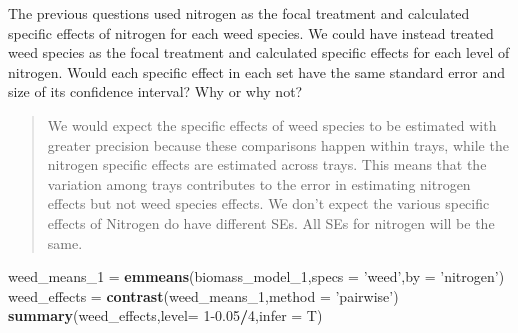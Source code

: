 \documentclass[
]{article}
\newenvironment{Shaded}{\begin{snugshade}}{\end{snugshade}}
\newcommand{\DataTypeTok}[1]{\textcolor[rgb]{0.13,0.29,0.53}{#1}}
\newcommand{\DecValTok}[1]{\textcolor[rgb]{0.00,0.00,0.81}{#1}}
\newcommand{\FloatTok}[1]{\textcolor[rgb]{0.00,0.00,0.81}{#1}}
\newcommand{\KeywordTok}[1]{\textcolor[rgb]{0.13,0.29,0.53}{\textbf{#1}}}
\newcommand{\NormalTok}[1]{#1}
\newcommand{\OperatorTok}[1]{\textcolor[rgb]{0.81,0.36,0.00}{\textbf{#1}}}
\newcommand{\StringTok}[1]{\textcolor[rgb]{0.31,0.60,0.02}{#1}}
\begin{document}
The previous questions used nitrogen as the focal treatment and
calculated specific effects of nitrogen for each weed species. We could
have instead treated weed species as the focal treatment and calculated
specific effects for each level of nitrogen. Would each specific effect
in each set have the same standard error and size of its confidence
interval? Why or why not?

\begin{quote}
We would expect the specific effects of weed species to be estimated
with greater precision because these comparisons happen within trays,
while the nitrogen specific effects are estimated across trays. This
means that the variation among trays contributes to the error in
estimating nitrogen effects but not weed species effects. We don't
expect the various specific effects of Nitrogen do have different SEs.
All SEs for nitrogen will be the same.
\end{quote}

\begin{Shaded}
\begin{Highlighting}[]
\NormalTok{weed_means_}\DecValTok{1}\NormalTok{ =}\StringTok{ }\KeywordTok{emmeans}\NormalTok{(biomass_model_}\DecValTok{1}\NormalTok{,}\DataTypeTok{specs =} \StringTok{'weed'}\NormalTok{,}\DataTypeTok{by =} \StringTok{'nitrogen'}\NormalTok{)}
\NormalTok{weed_effects =}\StringTok{ }\KeywordTok{contrast}\NormalTok{(weed_means_}\DecValTok{1}\NormalTok{,}\DataTypeTok{method =} \StringTok{'pairwise'}\NormalTok{)}
\KeywordTok{summary}\NormalTok{(weed_effects,}\DataTypeTok{level=} \DecValTok{1}\FloatTok{-0.05}\OperatorTok{/}\DecValTok{4}\NormalTok{,}\DataTypeTok{infer =}\NormalTok{ T)}
\end{Highlighting}
\end{Shaded}
\end{document}
